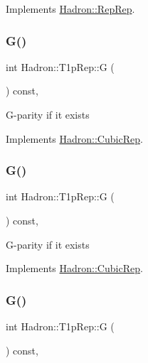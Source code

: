 Implements \mbox{\hyperlink{structHadron_1_1RepRep_a92c8802e5ed7afd7da43ccfd5b7cd92b}{Hadron\+::\+Rep\+Rep}}.

\mbox{\label{structHadron_1_1T1pRep_a750ea3ae748850c4d00338574076d7e0}} 
\subsubsection{\texorpdfstring{G()}{G()}\hspace{0.1cm}{\footnotesize\ttfamily [1/3]}}
{\footnotesize\ttfamily int Hadron\+::\+T1p\+Rep\+::G (\begin{DoxyParamCaption}{ }\end{DoxyParamCaption}) const\hspace{0.3cm}{\ttfamily [inline]}, {\ttfamily [virtual]}}

G-\/parity if it exists 

Implements \mbox{\hyperlink{structHadron_1_1CubicRep_a52104e43266d1614c00bbd1c3b395458}{Hadron\+::\+Cubic\+Rep}}.

\mbox{\label{structHadron_1_1T1pRep_a750ea3ae748850c4d00338574076d7e0}} 
\subsubsection{\texorpdfstring{G()}{G()}\hspace{0.1cm}{\footnotesize\ttfamily [2/3]}}
{\footnotesize\ttfamily int Hadron\+::\+T1p\+Rep\+::G (\begin{DoxyParamCaption}{ }\end{DoxyParamCaption}) const\hspace{0.3cm}{\ttfamily [inline]}, {\ttfamily [virtual]}}

G-\/parity if it exists 

Implements \mbox{\hyperlink{structHadron_1_1CubicRep_a52104e43266d1614c00bbd1c3b395458}{Hadron\+::\+Cubic\+Rep}}.

\mbox{\label{structHadron_1_1T1pRep_a750ea3ae748850c4d00338574076d7e0}} 
\subsubsection{\texorpdfstring{G()}{G()}\hspace{0.1cm}{\footnotesize\ttfamily [3/3]}}
{\footnotesize\ttfamily int Hadron\+::\+T1p\+Rep\+::G (\begin{DoxyParamCaption}{ }\end{DoxyParamCaption}) const\hspace{0.3cm}{\ttfamily [inline]}, {\ttfamily [virtual]}}

